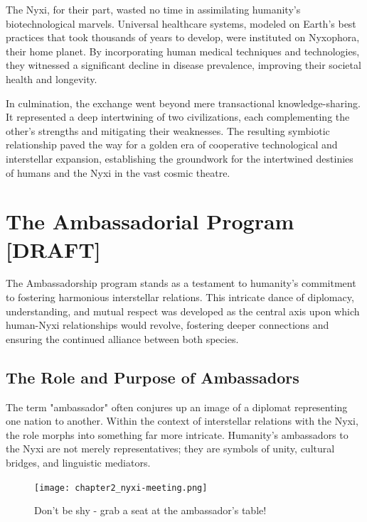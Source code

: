 The Nyxi, for their part, wasted no time in assimilating humanity's
biotechnological marvels. Universal healthcare systems, modeled on Earth's best
practices that took thousands of years to develop, were instituted on
Nyxophora, their home planet. By incorporating human medical techniques and
technologies, they witnessed a significant decline in disease prevalence,
improving their societal health and longevity.

In culmination, the exchange went beyond mere transactional knowledge-sharing.
It represented a deep intertwining of two civilizations, each complementing the
other's strengths and mitigating their weaknesses. The resulting symbiotic
relationship paved the way for a golden era of cooperative technological and
interstellar expansion, establishing the groundwork for the intertwined
destinies of humans and the Nyxi in the vast cosmic theatre.



\chapter{The Ambassadorial Program [DRAFT]}

The Ambassadorship program stands as a testament to humanity's commitment to
fostering harmonious interstellar relations. This intricate dance of diplomacy,
understanding, and mutual respect was developed as the central axis upon which
human-Nyxi relationships would revolve, fostering deeper connections and
ensuring the continued alliance between both species.

\section{The Role and Purpose of Ambassadors}

The term "ambassador" often conjures up an image of a diplomat representing one
nation to another. Within the context of interstellar relations with the Nyxi,
the role morphs into something far more intricate. Humanity's ambassadors to
the Nyxi are not merely representatives; they are symbols of unity, cultural
bridges, and linguistic mediators.

\begin{figure}
	\begin{center}
		\texttt{[image: chapter2\_nyxi-meeting.png]}
	\end{center}
	\caption{Don't be shy - grab a seat at the ambassador's table!}
\end{figure}

